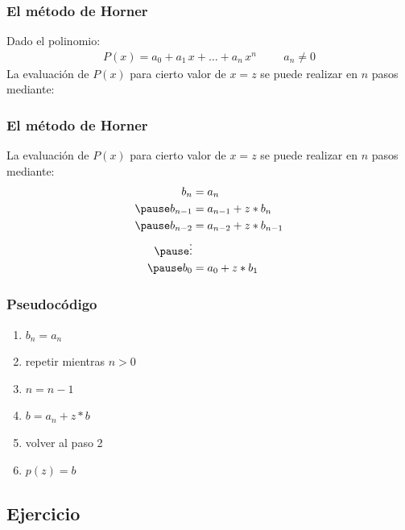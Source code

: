 \documentclass[12pt]{beamer}
\begin{document}
\begin{frame}
\frametitle{El método de Horner}
Dado el polinomio:
\pause
\begin{align*}
P (x) = a_{0} + a_{1} \, x + \ldots + a_{n} \, x^{n} \hspace{1cm} a_{n} \neq 0
\end{align*}
\pause
La evaluación de $P (x)$ para cierto valor de $x = z$ se puede realizar en $n$ pasos mediante:
\end{frame}
\begin{frame}
\frametitle{El método de Horner}
La evaluación de $P (x)$ para cierto valor de $x = z$ se puede realizar en $n$ pasos mediante:
\begin{eqnarray*}
\begin{aligned}
b_{n} &= a_{n} \\ \pause
b_{n-1} &= a_{n-1} + z * b_{n} \\ \pause
b_{n-2} &= a_{n-2} + z * b_{n-1} \\ \pause
\vdots \\ \pause
b_{0} &= a_{0} + z * b_{1}
\end{aligned}
\end{eqnarray*}
\end{frame}
\begin{frame}
\frametitle{Pseudocódigo}
\begin{enumerate}[<+->]
\item $b_{n} = a_{n}$
\item repetir mientras $n > 0$
\item $n = n - 1$
\item $b = a_{n} + z * b$
\item volver al paso 2
\item $p (z) = b$
\end{enumerate}
\end{frame}

\subsection{Ejercicio}
\end{document}
